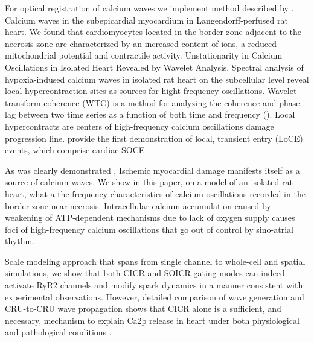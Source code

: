 \documentclass{biophys-new}
\begin{document}
For optical registration of calcium waves we implement method described by \cite{matsuura2018intravital}.
Calcium waves in the subepicardial myocardium in Langendorff-perfused rat heart.
We found that cardiomyocytes located in the border zone adjacent to the necrosis zone are characterized by an increased content of  ions, a reduced mitochondrial potential and contractile activity.
Unstationarity in Calcium Oscillations in Isolated Heart Revealed by Wavelet Analysis.
Spectral analysis of hypoxia-indused calcium waves in isolated rat heart on the subcellular level reveal local hypercontraction sites as sources for hight-frequency oscillations.
Wavelet transform coherence (WTC) is a method for analyzing the coherence and phase lag between two time series as a function of both time and frequency (\cite{chang2010time}).
Local hypercontracts are centers of high-frequency calcium oscillations
damage progression line.
\cite{bonilla2019enhancement} provide the first demonstration of local, transient  entry
(LoCE) events, which comprise cardiac SOCE.

As was clearly demonstrated \cite{matsuura2018intravital},
Ischemic myocardial damage manifests itself as a source of calcium waves.
We show in this paper, on a model of an isolated rat heart, what a the frequency characteristics of calcium oscillations recorded in the border zone near necrosis.
Intracellular calcium accumulation caused by weakening of ATP-dependent mechanisms due to lack of oxygen supply causes foci of high-frequency calcium oscillations that go out of control by sino-atrial thythm.

Scale modeling approach that spans from single channel to whole-cell and spatial
simulations, we show that both CICR and SOICR gating modes can indeed activate RyR2 channels and modify  spark dynamics in a manner consistent
with experimental observations.
However, detailed comparison of  wave
generation and CRU-to-CRU  wave propagation shows that CICR alone
is a sufficient, and necessary, mechanism to explain Ca2þ release in heart under
both physiological and pathological conditions
\cite{williams2017does}.
\end{document}
